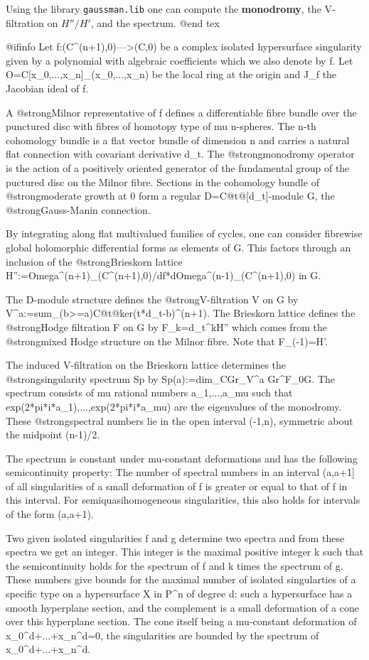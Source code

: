 Using the library {\tt gaussman.lib} one can compute the {\bf monodromy}, the V-filtration on $H''/H'$, and the spectrum.
@end tex

@ifinfo
Let f:(C^(n+1),0)--->(C,0) be a complex isolated hypersurface singularity given by a polynomial with algebraic coefficients which we also denote by f.
Let O=C[x_0,...,x_n]_(x_0,...,x_n) be the local ring at the origin and J_f the Jacobian ideal of f.

A @strong{Milnor representative} of f defines a differentiable fibre bundle over the punctured disc with fibres of homotopy type of mu n-spheres.
The n-th cohomology bundle is a flat vector bundle of dimension n and carries a natural flat connection with covariant derivative d_t.
The @strong{monodromy operator} is the action of a positively oriented generator of the fundamental group of the puctured disc on the Milnor fibre.
Sections in the cohomology bundle of @strong{moderate growth} at 0 form a regular D=C@{t@}[d_t]-module G, the @strong{Gauss-Manin connection}.

By integrating along flat multivalued families of cycles, one can consider fibrewise global holomorphic differential forms as elements of G.
This factors through an inclusion of the @strong{Brieskorn lattice} H'':=Omega^(n+1)_(C^(n+1),0)/df*dOmega^(n-1)_(C^(n+1),0) in G.

The D-module structure defines the @strong{V-filtration} V on G by V^a:=sum_(b>=a)C@{t@}ker(t*d_t-b)^(n+1).
The Brieskorn lattice defines the @strong{Hodge filtration} F on G by F_k=d_t^kH'' which comes from the @strong{mixed Hodge structure} on the Milnor fibre.
Note that F_(-1)=H'.

The induced V-filtration on the Brieskorn lattice determines the @strong{singularity spectrum} Sp by Sp(a):=dim_CGr_V^a Gr^F_0G.
The spectrum consists of mu rational numbers a_1,...,a_mu such that exp(2*pi*i*a_1),...,exp(2*pi*i*a_mu) are the eigenvalues of the monodromy.
These @strong{spectral numbers} lie in the open interval (-1,n), symmetric about the midpoint (n-1)/2.

The spectrum is constant under mu-constant deformations and has the following semicontinuity property:
The number of spectral numbers in an interval (a,a+1] of all singularities of a small deformation of f is greater or equal to that of f in this interval.
For semiquasihomogeneous singularities, this also holds for intervals of the form (a,a+1).

Two given isolated singularities f and g determine two spectra and from these spectra we get an integer.
This integer is the maximal positive integer k such that the semicontinuity holds for the spectrum of f and k times the spectrum of g.
These numbers give bounds for the maximal number of isolated singularties of a specific type on a hypersurface X in P^n of degree d: 
such a hypersurface has a smooth hyperplane section, and the complement is a small deformation of a cone over this hyperplane section.
The cone itself being a mu-constant deformation of x_0^d+...+x_n^d=0, the singularities are bounded by the spectrum of x_0^d+...+x_n^d.


